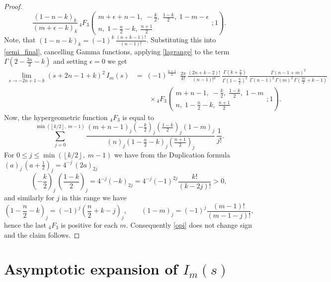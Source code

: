 \documentclass{article}
\theoremstyle{boldremark}
\renewcommand\[{\begin{equation}}
\renewcommand\]{\end{equation}}
\theoremstyle{definition}
\numberwithin{equation}{section}
\begin{document}
\begin{proof}
\begin{equation}
\frac{(1-n-k)_k}{(m+\epsilon-k)_k}
\,{}_4F_3\!\left(
\begin{matrix}
m+\epsilon+n-1,\; -\frac k2,\; \frac{1-k}{2},\; 1-m-\epsilon \\[4 pt]
n,\; 1-\frac n2-k,\; \frac{n+1}{2}
\end{matrix}
;1
\right).
\end{equation}
Note, that $(1-n-k)_k = (-1)^k\,\frac{(n+k-1)!}{(n-1)!}$. Substituting this into \eqref{semi_final}, cancelling Gamma functions, applying \eqref{lagrange} to the term $\Gamma(2-\frac{3n}{2}-k)$ and setting $\epsilon = 0$ we get 
\begin{align}\nonumber
\lim_{s \rightarrow -2n +1 -k}(s + 2n-1+k)^2\,I_{m}(s) &=\;(-1)^{\frac{n+1}{2}}\,
\frac{}{} \,\frac{2\pi}{k!}\,\frac{(2n+k-2)!}{(n-1)!^2}\,
\frac{\Gamma\!\left(k+\frac n2\right)}{\Gamma\!\left(1-\frac n2\right)^2}\,
\frac{\Gamma(n-1+m)^2}
{\Gamma(n-1)^2\,\Gamma(m)^2\,\Gamma\!\left(\frac{3n}{2}+k-1\right)}\,\\\label{opi}
&\qquad\times
{}_4F_3\!\left(
\begin{matrix}
m+n-1,\; -\frac k2,\; \frac{1-k}{2},\; 1-m \\[4 pt]
n,\; 1-\frac n2-k,\; \frac{n+1}{2}
\end{matrix}
;1
\right).
\end{align}
Now, the hypergeometric function $_4F_3$ is equal to
\begin{equation*}
 \sum_{j=0}^{\min\left(\left\lfloor k/2\right\rfloor,\; m-1\right)}
\frac{(m+n-1)_j\left(-\frac k2\right)_j\left(\frac{1-k}{2}\right)_j(1-m)_j}
{(n)_j\left(1-\frac n2-k\right)_j\left(\frac{n+1}{2}\right)_j}\,
\frac{1}{j!}.
\end{equation*}
For $0\leq j \leq \min\left(\left\lfloor k/2\right\rfloor,\; m-1\right)$ we 
have from the Duplication formula $(a)_j\,(a +\frac{1}{2})_j = 4^{-j}\,(2a)_{2j}$
$$
\left(-\frac{k}{2} \right)_j\, \left( \frac{1-k}{2}\right)_j = 4^{-j}(-k)_{2j} = 4^{-j} (-1)^{2j} \frac{k!}{(k-2j)!} > 0,
$$
and similarly for $j$ in this range we have 
$$
\left(1 - \frac{n}{2} -k \right)_j = (-1)^j \left(\frac{n}{2} + k - j\right)_j, \qquad (1-m)_j = (-1)^j\frac{(m-1)!}{(m-1-j)!},
$$
hence the last $_4F_3$ is positive for each $m$. Consequently \eqref{opi} does not change sign and the claim follows.
\end{proof}
\section{Asymptotic expansion of $I_m(s)$}
\end{document}
